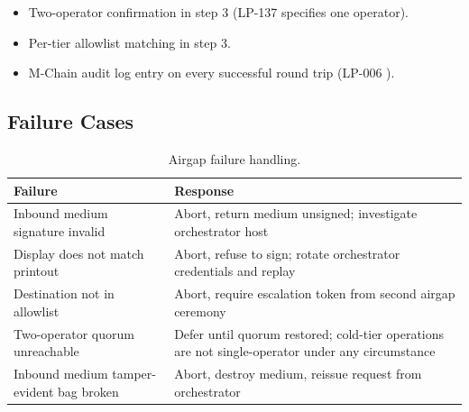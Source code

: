 \begin{itemize}[nosep]
\item Two-operator confirmation in step 3 (LP-137 specifies one
operator).
\item Per-tier allowlist matching in step 3.
\item M-Chain audit log entry on every successful round trip
(LP-006 \cite{lp006}).
\end{itemize}

\subsection{Failure Cases}

\begin{table}[h]
\centering
\small
\begin{tabular}{p{6cm}p{8cm}}
\toprule
\textbf{Failure} & \textbf{Response} \\
\midrule
Inbound medium signature invalid &
Abort, return medium unsigned; investigate orchestrator host \\
Display does not match printout &
Abort, refuse to sign; rotate orchestrator credentials and replay \\
Destination not in allowlist &
Abort, require escalation token from second airgap ceremony \\
Two-operator quorum unreachable &
Defer until quorum restored; cold-tier operations are not single-operator
under any circumstance \\
Inbound medium tamper-evident bag broken &
Abort, destroy medium, reissue request from orchestrator \\
\bottomrule
\end{tabular}
\caption{Airgap failure handling.}
\label{tab:airgap-failures}
\end{table}

